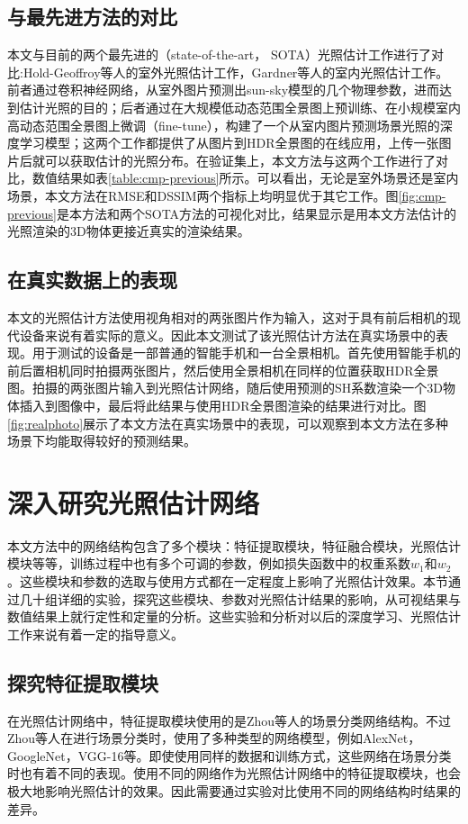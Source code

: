\subsection{与最先进方法的对比}

本文与目前的两个最先进的（state-of-the-art， SOTA）光照估计工作进行了对比:Hold-Geoffroy等人\cite{hold2017deep}的室外光照估计工作，Gardner等人\cite{gardner2017learning}的室内光照估计工作。前者通过卷积神经网络，从室外图片预测出sun-sky模型\cite{hovsekhovsek2013adding}的几个物理参数，进而达到估计光照的目的；后者通过在大规模低动态范围全景图上预训练、在小规模室内高动态范围全景图上微调（fine-tune），构建了一个从室内图片预测场景光照的深度学习模型；这两个工作都提供了从图片到HDR全景图的在线应用，上传一张图片后就可以获取估计的光照分布。在验证集上，本文方法与这两个工作进行了对比，数值结果如表\ref{table:cmp-previous}所示。可以看出，无论是室外场景还是室内场景，本文方法在RMSE和DSSIM两个指标上均明显优于其它工作。图\ref{fig:cmp-previous}是本方法和两个SOTA方法的可视化对比，结果显示是用本文方法估计的光照渲染的3D物体更接近真实的渲染结果。


\subsection{在真实数据上的表现}
本文的光照估计方法使用视角相对的两张图片作为输入，这对于具有前后相机的现代设备来说有着实际的意义。因此本文测试了该光照估计方法在真实场景中的表现。用于测试的设备是一部普通的智能手机和一台全景相机。首先使用智能手机的前后置相机同时拍摄两张图片，然后使用全景相机在同样的位置获取HDR全景图。拍摄的两张图片输入到光照估计网络，随后使用预测的SH系数渲染一个3D物体插入到图像中，最后将此结果与使用HDR全景图渲染的结果进行对比。图\ref{fig:realphoto}展示了本文方法在真实场景中的表现，可以观察到本文方法在多种场景下均能取得较好的预测结果。

\section{深入研究光照估计网络}\label{sec:ablation-study}
本文方法中的网络结构包含了多个模块：特征提取模块，特征融合模块，光照估计模块等等，训练过程中也有多个可调的参数，例如损失函数中的权重系数$w_1$和$w_2$。这些模块和参数的选取与使用方式都在一定程度上影响了光照估计效果。本节通过几十组详细的实验，探究这些模块、参数对光照估计结果的影响，从可视结果与数值结果上就行定性和定量的分析。这些实验和分析对以后的深度学习、光照估计工作来说有着一定的指导意义。

\subsection{探究特征提取模块}
在光照估计网络中，特征提取模块使用的是Zhou等人\cite{zhou2017places}的场景分类网络结构。不过Zhou等人\cite{zhou2017places}在进行场景分类时，使用了多种类型的网络模型，例如AlexNet\cite{krizhevsky2012imagenet}，GoogleNet\cite{szegedy2015going}，VGG-16\cite{simonyan2014very}等。即使使用同样的数据和训练方式，这些网络在场景分类时也有着不同的表现。使用不同的网络作为光照估计网络中的特征提取模块，也会极大地影响光照估计的效果。因此需要通过实验对比使用不同的网络结构时结果的差异。

